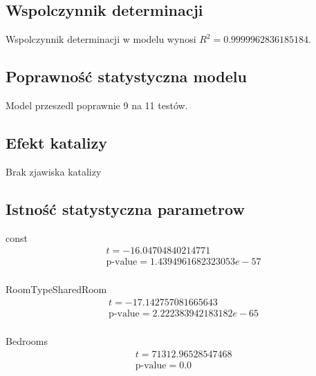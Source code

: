 \subsection{Wspolczynnik determinacji}\label{subsec:wspolczynnik-determinacji}

Wspolczynnik determinacji w modelu wynosi \(R^{2} = 0.9999962836185184\).

\subsection{Poprawność statystyczna modelu}\label{subsec:poprawnośc-statystyczna-modelu}

Model przeszedl poprawnie 9 na 11 testów.

\subsection{Efekt katalizy}\label{subsec:efekt-katalizy}


Brak zjawiska katalizy

\subsection{Istność statystyczna parametrow}\label{subsec:istotność-parametrów}

const
\begin{equation}
    \begin{split}
        &t = -16.04704840214771  \\  &\text{p-value}= 1.4394961682323053e-57 \\
    \end{split}
\end{equation}

RoomTypeSharedRoom
\begin{equation}
    \begin{split}
        &t = -17.142757081665643 \\ &\text{p-value}= 2.222383942183182e-65  \\
    \end{split}
\end{equation}


Bedrooms
\begin{equation}
    \begin{split}
        &t = 71312.96528547468 \\ &\text{p-value}= 0.0
    \end{split}
\end{equation}

